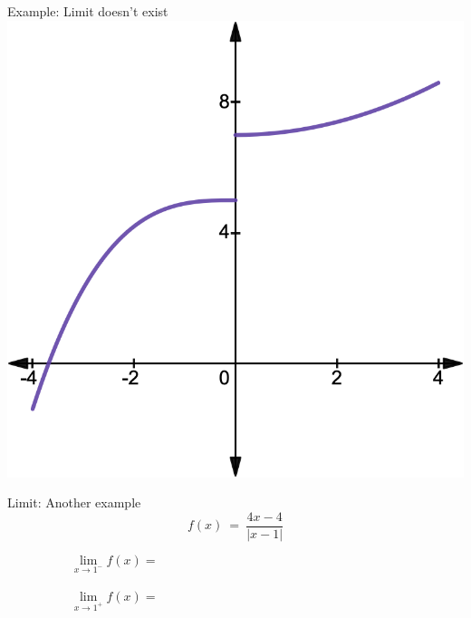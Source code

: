 \documentclass{./../../Latex/teaching_slides}
\begin{document}
\begin{frame}{Example: Limit doesn't exist}
\vspace{1em}
\centering
\includegraphics[scale=0.225]{lim1.png}
\end{frame}

\begin{frame}{Limit: Another example}
$$f(x)\ =\ \frac{4x-4}{\left|x-1\right|} $$
\vspace{1em}

$$\lim_{x \rightarrow 1^-} f(x) = \hspace{8cm} $$ \\

$$\lim_{x \rightarrow 1^+} f(x) = \hspace{8cm} $$

\end{frame}
\end{document}
